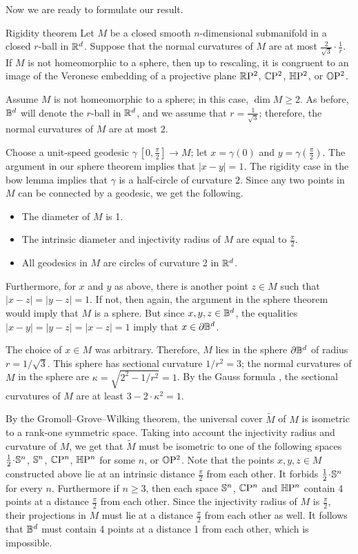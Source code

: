 \documentclass[a4paper,10pt]{article}
\begin{document}
Now we are ready to formulate our result.

\begin{thm}{Rigidity theorem}
Let $M$ be a closed smooth $n$-dimensional submanifold in a closed $r$-ball in $\mathbb{R}^d$.
Suppose that the normal curvatures of $M$ are at most $\tfrac2{\sqrt{3}}\cdot\tfrac1r$.
If $M$ is not homeomorphic to a sphere, then up to rescaling, it is congruent to an image of the Veronese embedding of a projective plane $\mathbb{R}\mathrm{P}^2$, $\mathbb{C}\mathrm{P}^2$, $\mathbb{H}\mathrm{P}^2$, or $\mathbb{O}\mathrm{P}^2$.
\end{thm}

Assume $M$ is not homeomorphic to a sphere;
in this case, $\dim M\ge 2$.
As before, $\mathbb{B}^d$ will denote the $r$-ball in $\mathbb{R}^d$, and we assume that $r=\tfrac1{\sqrt{3}}$;
therefore, the normal curvatures of $M$ are at most $2$.



Choose a unit-speed geodesic $\gamma\:[0,\tfrac\pi2]\to M$;
let $x=\gamma(0)$ and $y=\gamma(\tfrac\pi2)$.
The argument in our sphere theorem implies that $|x-y|=1$.
The rigidity case in the bow lemma implies that $\gamma$ is a half-circle of curvature $2$.
Since any two points in $M$ can be connected by a geodesic, we get the following.
\begin{itemize}
 \item The diameter of $M$ is 1.
 \item The intrinsic diameter and injectivity radius of $M$ are equal to $\tfrac\pi2$.
 \item All geodesics in $M$ are circles of curvature 2 in $\mathbb{R}^d$.
\end{itemize}

Furthermore, for $x$ and $y$ as above,
there is another point $z\in M$ such that $|x-z|=|y-z|=1$.
If not, then again, the argument in the sphere theorem would imply that $M$ is a sphere.
But since $x,y,z\in\mathbb{B}^d$,
the equalities $|x-y|=|y-z|=|x-z|=1$ imply that $x\in \partial \mathbb{B}^d$.

The choice of $x\in M$ was arbitrary.
Therefore, $M$ lies in the sphere $\partial \mathbb{B}^d$ of radius $r=1/\sqrt{3}$.
This sphere has sectional curvature $1/r^2=3$;
the normal curvatures of $M$ in the sphere are $\kappa=\sqrt{2^2-1/r^2}=1$.
By the Gauss formula \cite[Lemma 5]{petrunin2024}, the sectional curvatures of $M$ are at least $3-2\cdot \kappa^2=1$.

By the Gromoll--Grove--Wilking theorem, the universal cover $\tilde M$ of $M$ is isometric to a rank-one symmetric space.
Taking into account the injectivity radius and curvature of $M$, we get that $\tilde M$ must be isometric to one of the following spaces
$\tfrac12\cdot \SSS^n$, $\mathbb{S}^n$, $\mathbb{C}\mathrm{P}^n$, $\mathbb{H}\mathrm{P}^n$ for some $n$, or $\mathbb{O}\mathrm{P}^2$.
Note that the points $x,y,z\in M$ constructed above lie at an intrinsic distance $\tfrac\pi2$ from each other.
It forbids $\tfrac12\cdot \SSS^n$ for every $n$.
Furthermore if $n\ge 3$, then each space  $\mathbb{S}^n$, $\mathbb{C}\mathrm{P}^n$ and $\mathbb{H}\mathrm{P}^n$ contain 4 points at a distance $\tfrac\pi2$ from each other.
Since the injectivity radius of $M$ is $\tfrac\pi2$, their projections in $M$ must lie at a distance $\tfrac\pi2$ from each other as well.
It follows that $\mathbb{B}^d$ must contain 4 points at a distance 1 from each other, which is impossible.
\end{document}
